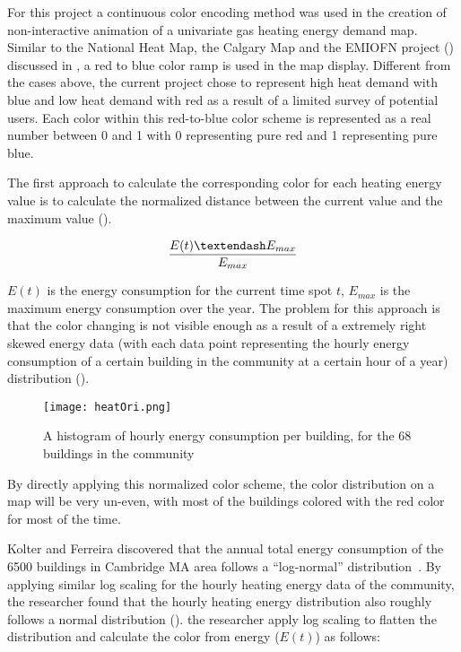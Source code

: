 For this project a continuous color encoding method was used in the
creation of non-interactive animation of a univariate gas heating
energy demand map. Similar to the National Heat Map, the Calgary Map
and the EMIOFN project () discussed in
, a red to blue color ramp is used in the map
display. Different from the cases above, the current project chose to
represent high heat demand with blue and low heat demand with red as a
result of a limited survey of potential users. Each color within this
red-to-blue color scheme is represented as a real number between 0 and
1 with 0 representing pure red and 1 representing pure blue.

The first approach to calculate the corresponding color for each
heating energy value is to calculate the normalized distance between
the current value and the maximum value ().

\begin{equation}\label{eq:linear}
  {E(t) – E_{max} \over E_{max}}
\end{equation}

$E(t)$ is the energy consumption for the current time spot $t$,
$E_{max}$ is the maximum energy consumption over the year. The problem
for this approach is that the color changing is not visible enough as
a result of a extremely right skewed energy data (with each data point
representing the hourly energy consumption of a certain building in
the community at a certain hour of a year) distribution
().

\begin{figure}[h!]
  \centering
  \texttt{[image: heatOri.png]}
  \caption[Heating Demand Histogram of Conceptual City]{A histogram of
    hourly energy consumption per building, for the 68 buildings in
    the community}
  \label{fig:heatOri}
\end{figure}

By directly applying this normalized color scheme, the color
distribution on a map will be very un-even, with most of the buildings
colored with the red color for most of the time.

Kolter and Ferreira discovered that the annual total energy
consumption of the 6500 buildings in Cambridge MA area follows a
``log-normal'' distribution~\cite{Zico2011}. By applying similar log
scaling for the hourly heating energy data of the community, the researcher found
that the hourly heating energy distribution also roughly follows a
normal distribution (). the researcher apply log scaling to
flatten the distribution and calculate the color from energy
($E(t)$) as follows:

